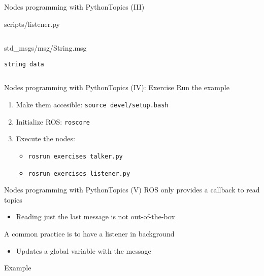 \documentclass[10pt,compress]{beamer} %
\begin{document}
\begin{frame}[fragile]{Nodes programming with Python}{Topics (III)}
	\label{listener}
    \vspace{-0.4cm}
	\begin{block}{scripts/listener.py}
    \vspace{-0.2cm}
        
    \vspace{-0.2cm}
	\end{block}

    \vspace{-1.7cm}
	\begin{columns}
    \vspace{-0.2cm}
	\begin{exampleblock}{std\_msgs/msg/String.msg}
\begin{verbatim}
string data
\end{verbatim}
    \vspace{-0.3cm}
	\end{exampleblock}
	\end{columns}
\end{frame}

\begin{frame}{Nodes programming with Python}{Topics (IV): Exercise}
	Run the example
	\begin{enumerate}
		\item Make them accesible: \texttt{source devel/setup.bash}
		\item Initialize ROS: \texttt{roscore}
		\item Execute the nodes: 
			\begin{itemize}
				\item \texttt{rosrun exercises talker.py}
				\item \texttt{rosrun exercises listener.py}
			\end{itemize}
	\end{enumerate}
\end{frame}

\begin{frame}{Nodes programming with Python}{Topics (V)}
	ROS only provides a callback to read topics
	\begin{itemize}
		\item Reading just the last message is not out-of-the-box
	\end{itemize}
	A common practice is to have a listener in background
	\begin{itemize}
		\item Updates a global variable with the message
	\end{itemize}

    \vspace{-0.2cm}
	\begin{exampleblock}{Example}
    \vspace{-0.2cm}
        
    \vspace{-0.3cm}
	\end{exampleblock}

\end{frame}
\end{document}
